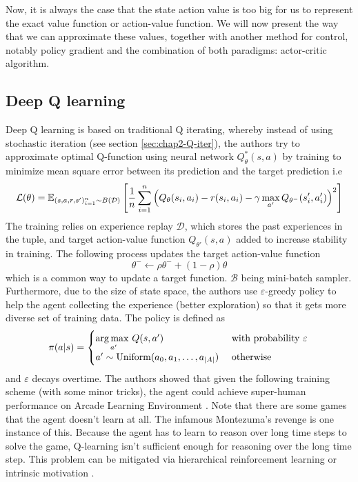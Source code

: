 \label{sec:chap2-deep-rl}
Now, it is always the case that the state action value is too big for us to represent the exact value function or action-value function. We will now present the way that we can approximate these values, together with another method for control, notably policy gradient and the combination of both paradigms: actor-critic algorithm.

\subsection{Deep Q learning \cite{mnih2015human}}
Deep Q learning is based on traditional Q iterating, whereby instead of using stochastic iteration (see section \ref{sec:chap2-Q-iter}), the authors try to approximate optimal Q-function using neural network $Q_\theta^*(s, a)$ by training to minimize mean square error between its prediction and the target prediction i.e
\begin{equation}
    \mathcal{L}(\theta) = \mathbb{E}_{(s, a, r, s')^n_{i=1} \sim B(\mathcal{D})}\left[  \frac{1}{n}\sum^n_{i=1} \left( Q_{\theta}(s_i, a_i) - r(s_i, a_i) - \gamma\max_{a'} Q_{\theta^-}(s'_i, a'_i) \right)^2  \right]
\end{equation}
The training relies on experience replay $\mathcal{D}$, which stores the past experiences in the tuple, and target action-value function $Q_{\theta'}(s, a)$ added to increase stability in training. The following process updates the target action-value function 
\begin{equation}
\label{eqn:chap2-update-target}
    \theta^- \leftarrow \rho \theta^- + (1-\rho) \theta
\end{equation}
which is a common way to update a target function. $\mathcal{B}$ being mini-batch sampler. Furthermore, due to the size of state space, the authors use $\varepsilon$-greedy policy to help the agent collecting the experience (better exploration) so that it gets more diverse set of training data. The policy is defined as
\begin{equation}
    \pi(a | s) = \begin{cases}
        \underset{a'}{\arg\max \ } Q(s, a') &\text{ with probability } \varepsilon \\
        a' \sim \text{Uniform}(a_0, a_1, \dots, a_{|A|}) &\text{ otherwise } \\
    \end{cases} \\
\end{equation}
and $\varepsilon$ decays overtime. The authors showed that given the following training scheme (with some minor tricks), the agent could achieve super-human performance on Arcade Learning Environment \cite{bellemare2013arcade}. Note that there are some games that the agent doesn't learn at all. The infamous Montezuma's revenge is one instance of this. Because the agent has to learn to reason over long time steps to solve the game, Q-learning isn't sufficient enough for reasoning over the long time step. This problem can be mitigated via hierarchical reinforcement learning \cite{kulkarni2016hierarchical, dayan1993feudal, vezhnevets2017feudal} or intrinsic motivation \cite{pathak2017curiosity}. 

